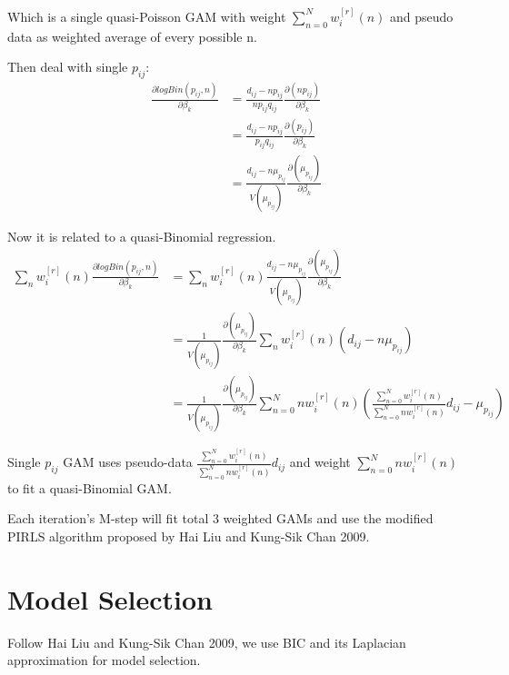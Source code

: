 \documentclass[]{article}
\begin{document}
Which is a single quasi-Poisson GAM with weight $\sum_{n=0}^{N}w_{i}^{[r]}(n)$ and pseudo data as weighted average of every possible n.

Then deal with single $p_{ij}$:
\begin{equation}
	\begin{aligned}
	\frac{\partial logBin(p_{ij},n)}{\partial \beta_{k}}&=\frac{d_{ij}-np_{ij}}{np_{ij}q_{ij}}\frac{\partial(np_{ij})}{\partial \beta_{k}}\\
	&=\frac{d_{ij}-np_{ij}}{p_{ij}q_{ij}}\frac{\partial(p_{ij})}{\partial \beta_{k}}\\
	&=\frac{d_{ij}-n\mu_{p_{ij}}}{V(\mu_{p_{ij}})}\frac{\partial(\mu_{p_{ij}})}{\partial \beta_{k}}
	\end{aligned}
\end{equation}

Now it is related to a quasi-Binomial regression.
\begin{equation}
	\begin{aligned}
	\sum_{n}w_{i}^{[r]}(n)\frac{\partial logBin(p_{ij},n)}{\partial \beta_{k}}
	&=\sum_{n}w_{i}^{[r]}(n)\frac{d_{ij}-n\mu_{p_{ij}}}{V(\mu_{p_{ij}})}\frac{\partial(\mu_{p_{ij}})}{\partial \beta_{k}}\\
	&=\frac{1}{V(\mu_{p_{ij}})}\frac{\partial(\mu_{p_{ij}})}{\partial \beta_{k}}\sum_{n}w_{i}^{[r]}(n)(d_{ij}-n\mu_{p_{ij}})\\
	&=\frac{1}{V(\mu_{p_{ij}})}\frac{\partial(\mu_{p_{ij}})}{\partial \beta_{k}}\sum_{n=0}^{N}nw_{i}^{[r]}(n)(\frac{\sum_{n=0}^{N}w_{i}^{[r]}(n)}{\sum_{n=0}^{N}nw_{i}^{[r]}(n)}d_{ij}-\mu_{p_{ij}})
	\end{aligned}
\end{equation}

Single $p_{ij}$ GAM uses pseudo-data $\frac{\sum_{n=0}^{N}w_{i}^{[r]}(n)}{\sum_{n=0}^{N}nw_{i}^{[r]}(n)}d_{ij}$ and weight $\sum_{n=0}^{N}nw_{i}^{[r]}(n)$ to fit a quasi-Binomial GAM.


Each iteration's M-step will fit total 3 weighted GAMs and use the modified PIRLS algorithm proposed by Hai Liu and Kung-Sik Chan 2009.

\section{Model Selection}
Follow Hai Liu and Kung-Sik Chan 2009, we use BIC and its Laplacian approximation for model selection. 
\end{document}
